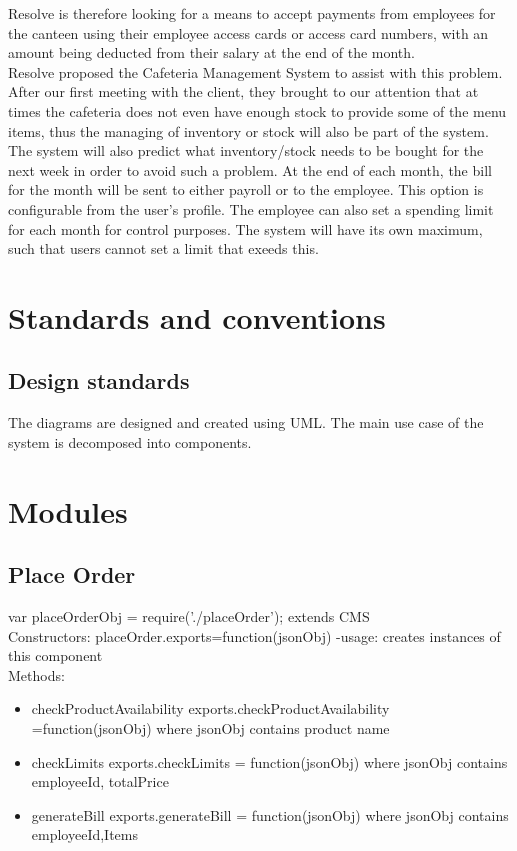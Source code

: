 \documentclass[12pt]{article}
\begin{document}
Resolve is therefore looking for a means to accept payments from employees for the canteen using their employee access cards or access card numbers, with an amount being deducted from their salary at the end of the month.\\

Resolve proposed the Cafeteria Management System to assist with this problem.
After our first meeting with the client, they brought to our attention that at times the cafeteria does not even have enough stock to provide some of the menu items, thus the managing of inventory or stock will also be part of the system. The system will also predict what inventory/stock needs to be bought for the next week in order to avoid such a problem. At the end of each month, the bill for the month will be sent to either payroll or to the employee. This option is configurable from the user's profile. The employee can also set a spending limit for each month for control purposes. The system will have its own maximum, such that users cannot set a limit that exeeds this. 


\section{Standards and conventions}

\subsection{Design standards}
 The diagrams are designed and created using UML. The main use case of the system is decomposed into components.

\section{Modules}
\subsection{Place Order}
var placeOrderObj = require('./placeOrder');
extends CMS
\\
Constructors: 
 	placeOrder.exports=function(jsonObj){}
	-usage: creates instances of this component
\\
Methods:
\begin{itemize}
\item checkProductAvailability
        exports.checkProductAvailability =function(jsonObj){} where jsonObj contains product name
\item checkLimits
	exports.checkLimits = function(jsonObj){} where jsonObj contains employeeId, totalPrice
\item generateBill
	exports.generateBill = function(jsonObj){} where jsonObj contains employeeId,Items
\end{itemize}
 
\end{document}
